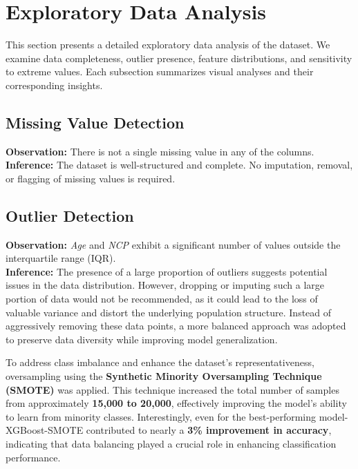 \chapter{Exploratory Data Analysis}\label{ch:exploratory-data-analysis}

This section presents a detailed exploratory data analysis of the dataset.
We examine data completeness, outlier presence, feature distributions, and sensitivity to extreme values.
Each subsection summarizes visual analyses and their corresponding insights.



\section{Missing Value Detection}\label{sec:missing-value-detection}
\textbf{Observation:} There is not a single missing value in any of the columns.\\
\textbf{Inference:} The dataset is well-structured and complete.
No imputation, removal, or flagging of missing values is required.



\section{Outlier Detection}\label{sec:outlier-detection}
\textbf{Observation:} \textit{Age} and \textit{NCP} exhibit a significant number of values outside the interquartile range (IQR).\\
\textbf{Inference:}
The presence of a large proportion of outliers suggests potential issues in the data distribution.
However, dropping or imputing such a large portion of data would not be recommended, as it could lead to the loss of valuable variance and distort the underlying population structure.
Instead of aggressively removing these data points, a more balanced approach was adopted to preserve data diversity while improving model generalization.

To address class imbalance and enhance the dataset’s representativeness, oversampling using the \textbf{Synthetic Minority Oversampling Technique (SMOTE)} was applied.
This technique increased the total number of samples from approximately \textbf{15,000 to 20,000}, effectively improving the model’s ability to learn from minority classes.
Interestingly, even for the best-performing model- XGBoost-SMOTE contributed to nearly a \textbf{3\% improvement in accuracy}, indicating that data balancing played a crucial role in enhancing classification performance.


